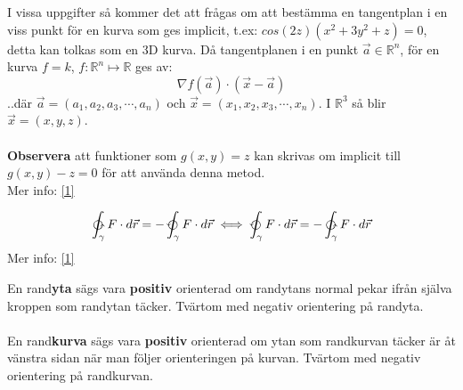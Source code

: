 \documentclass{report}
\begin{document}
{
	I vissa uppgifter så kommer det att frågas om att bestämma en tangentplan i en viss punkt för en kurva som ges implicit, t.ex: $ cos(2z)(x^2+3y^2+z) = 0 $, detta kan tolkas som en 3D kurva. Då tangentplanen i en punkt $\vec{a} \in \mathbb{R}^n $, för en kurva $f = k$, $f : \mathbb{R}^n \mapsto \mathbb{R} $ ges av:
	\begin{equation*}
		\nabla 	f(\vec{a}) \cdot (\vec{x} - \vec{a})
	\end{equation*}
	..där $\vec{a} = (a_1, a_2, a_3, \cdots, a_n)$ och $\vec{x} = (x_1, x_2, x_3, \cdots, x_n)$. I $\mathbb{R}^3$ så blir $\vec{x} = (x,y,z) $.\\\\
	
	\textbf{Observera} att funktioner som $g(x,y) = z$ kan skrivas om implicit till $g(x,y) - z = 0$ för att använda denna metod.\\
	Mer info: \href{https://math.stackexchange.com/a/2084635}{[1]}
}

{
	\begin{equation*}
		\ointctrclockwise_{\gamma} F \cdot d\vec{r} = -\varointctrclockwise_{\gamma} F \cdot d\vec{r} \iff \varointctrclockwise_{\gamma} F \cdot d\vec{r} = -\ointctrclockwise_{\gamma} F \cdot d\vec{r}
	\end{equation*}
	Mer info: \href{https://en.wikipedia.org/wiki/Vector_calculus_identities}{[1]}
}

{
	En rand\textbf{yta} sägs vara \textbf{positiv} orienterad om randytans normal pekar ifrån själva kroppen som randytan täcker. Tvärtom med negativ orientering på randyta.\\\\
	
	En rand\textbf{kurva} sägs vara \textbf{positiv} orienterad om ytan som randkurvan täcker är åt vänstra sidan när man följer orienteringen på kurvan. Tvärtom med negativ orientering på randkurvan.
}
\end{document}

